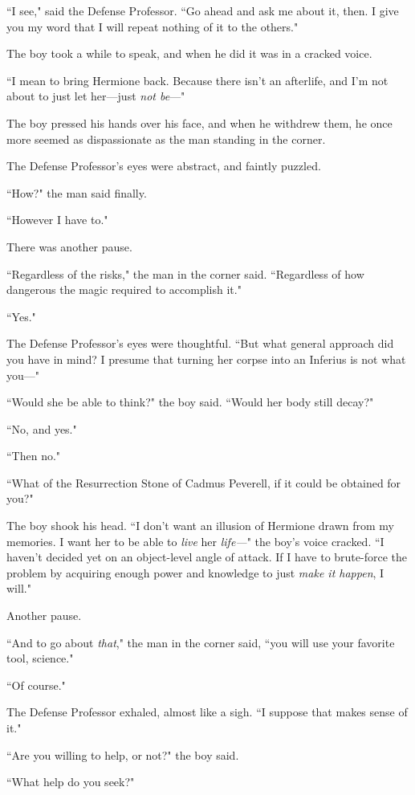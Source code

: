 ``I see," said the Defense Professor. ``Go ahead and ask me about it, then. I give you my word that I will repeat nothing of it to the others."

The boy took a while to speak, and when he did it was in a cracked voice.

``I mean to bring Hermione back. Because there isn't an afterlife, and I'm not about to just let her—just \emph{not be}—"

The boy pressed his hands over his face, and when he withdrew them, he once more seemed as dispassionate as the man standing in the corner.

The Defense Professor's eyes were abstract, and faintly puzzled.

``How?" the man said finally.

``However I have to."

There was another pause.

``Regardless of the risks," the man in the corner said. ``Regardless of how dangerous the magic required to accomplish it."

``Yes."

The Defense Professor's eyes were thoughtful. ``But what general approach did you have in mind? I presume that turning her corpse into an Inferius is not what you—"

``Would she be able to think?" the boy said. ``Would her body still decay?"

``No, and yes."

``Then no."

``What of the Resurrection Stone of Cadmus Peverell, if it could be obtained for you?"

The boy shook his head. ``I don't want an illusion of Hermione drawn from my memories. I want her to be able to \emph{live} her \emph{life—}" the boy's voice cracked. ``I haven't decided yet on an object-level angle of attack. If I have to brute-force the problem by acquiring enough power and knowledge to just \emph{make it happen}, I will."

Another pause.

``And to go about \emph{that}," the man in the corner said, ``you will use your favorite tool, science."

``Of course."

The Defense Professor exhaled, almost like a sigh. ``I suppose that makes sense of it."

``Are you willing to help, or not?" the boy said.

``What help do you seek?"


